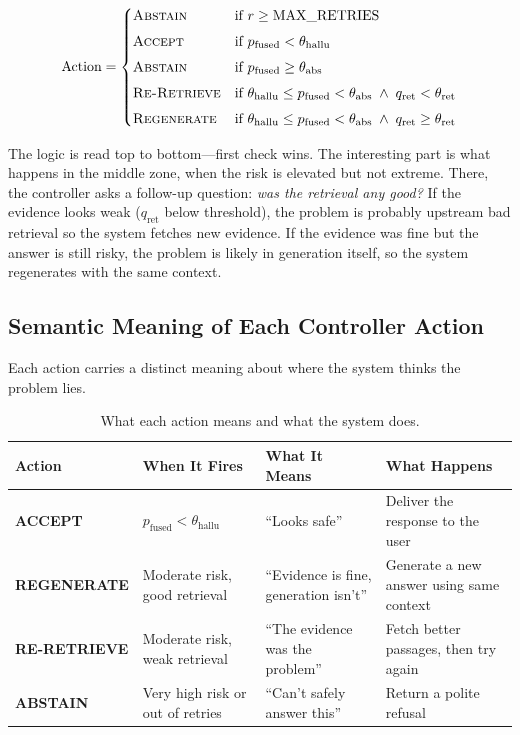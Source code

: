 \begin{equation}
\text{Action} = 
\begin{cases}
    \textsc{Abstain}      & \text{if } r \geq \text{MAX\_RETRIES} \\[4pt]
    \textsc{Accept}       & \text{if } p_{\text{fused}} < \theta_{\text{hallu}} \\[4pt]
    \textsc{Abstain}      & \text{if } p_{\text{fused}} \geq \theta_{\text{abs}} \\[4pt]
    \textsc{Re-Retrieve}  & \text{if } \theta_{\text{hallu}} \leq p_{\text{fused}} < \theta_{\text{abs}} \;\wedge\; q_{\text{ret}} < \theta_{\text{ret}} \\[4pt]
    \textsc{Regenerate}   & \text{if } \theta_{\text{hallu}} \leq p_{\text{fused}} < \theta_{\text{abs}} \;\wedge\; q_{\text{ret}} \geq \theta_{\text{ret}}
\end{cases}
\label{eq:controller_rule}
\end{equation}

The logic is read top to bottom---first check wins. The interesting part is what happens in the middle zone, when the risk is elevated but not extreme. There, the controller asks a follow-up question: \emph{was the retrieval any good?} If the evidence looks weak ($q_{\text{ret}}$ below threshold), the problem is probably upstream bad retrieval so the system fetches new evidence. If the evidence was fine but the answer is still risky, the problem is likely in generation itself, so the system regenerates with the same context.

\subsection{Semantic Meaning of Each Controller Action}
\label{sec:action_semantics}

Each action carries a distinct meaning about where the system thinks the problem lies.

\begin{table}[!htb]
\centering
\caption{What each action means and what the system does.}
\label{tab:action_semantics}
\small
\begin{tabular}{@{}l p{3cm} p{4cm} p{4cm}@{}}
\toprule
\textbf{Action} & \textbf{When It Fires} & \textbf{What It Means} & \textbf{What Happens} \\
\midrule
\textbf{ACCEPT} & $p_{\text{fused}} < \theta_{\text{hallu}}$ & ``Looks safe'' & Deliver the response to the user \\[4pt]
\textbf{REGENERATE} & Moderate risk, good retrieval & ``Evidence is fine, generation isn't'' & Generate a new answer using same context \\[4pt]
\textbf{RE-RETRIEVE} & Moderate risk, weak retrieval & ``The evidence was the problem'' & Fetch better passages, then try again \\[4pt]
\textbf{ABSTAIN} & Very high risk or out of retries & ``Can't safely answer this'' & Return a polite refusal \\
\bottomrule
\end{tabular}
\end{table}

